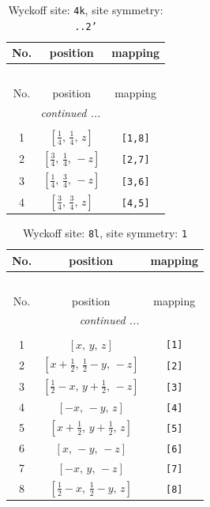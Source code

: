 \documentclass[fleqn,8pt]{jsarticle}
\begin{document}
\renewcommand{\arraystretch}{1.2}
\begin{longtable}{ccc}
\caption{Wyckoff site: {\tt 4k}, site symmetry: {\tt ..2'}}
 \\
 \hline \hline
No. & position & mapping \\ \hline \endfirsthead

\multicolumn{2}{l}{\tablename\ \thetable{}} \\
 \hline \hline
No. & position & mapping \\ \hline \endhead

 \hline \hline
\multicolumn{2}{r}{\footnotesize\it continued ...} \\ \endfoot

 \hline \hline
\multicolumn{2}{r}{} \\ \endlastfoot

1 & $\left[ \frac{1}{4},\, \frac{1}{4},\, z \right]$ & {\tt [1,8]} \\ \hline
2 & $\left[ \frac{3}{4},\, \frac{1}{4},\, - z \right]$ & {\tt [2,7]} \\ \hline
3 & $\left[ \frac{1}{4},\, \frac{3}{4},\, - z \right]$ & {\tt [3,6]} \\ \hline
4 & $\left[ \frac{3}{4},\, \frac{3}{4},\, z \right]$ & {\tt [4,5]} \\
\end{longtable}
\renewcommand{\arraystretch}{1.2}
\begin{longtable}{ccc}
\caption{Wyckoff site: {\tt 8l}, site symmetry: {\tt 1}}
 \\
 \hline \hline
No. & position & mapping \\ \hline \endfirsthead

\multicolumn{2}{l}{\tablename\ \thetable{}} \\
 \hline \hline
No. & position & mapping \\ \hline \endhead

 \hline \hline
\multicolumn{2}{r}{\footnotesize\it continued ...} \\ \endfoot

 \hline \hline
\multicolumn{2}{r}{} \\ \endlastfoot

1 & $\left[ x,\, y,\, z \right]$ & {\tt [1]} \\ \hline
2 & $\left[ x + \frac{1}{2},\, \frac{1}{2} - y,\, - z \right]$ & {\tt [2]} \\ \hline
3 & $\left[ \frac{1}{2} - x,\, y + \frac{1}{2},\, - z \right]$ & {\tt [3]} \\ \hline
4 & $\left[ - x,\, - y,\, z \right]$ & {\tt [4]} \\ \hline
5 & $\left[ x + \frac{1}{2},\, y + \frac{1}{2},\, z \right]$ & {\tt [5]} \\ \hline
6 & $\left[ x,\, - y,\, - z \right]$ & {\tt [6]} \\ \hline
7 & $\left[ - x,\, y,\, - z \right]$ & {\tt [7]} \\ \hline
8 & $\left[ \frac{1}{2} - x,\, \frac{1}{2} - y,\, z \right]$ & {\tt [8]} \\
\end{longtable}
\end{document}
